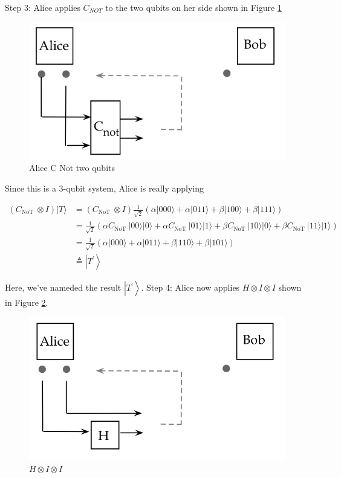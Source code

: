 \documentclass[main.tex]{subfiles}
\begin{document}
    Step 3: Alice applies $C_{NOT}$ to the two qubits on her side shown in Figure \ref{fig:30teleport3}
    
    \begin{figure}
        \centering
        \includegraphics[width=5in]{notes/figs/n07/30teleport3.png}
        \caption{Alice C Not two qubits}
        \label{fig:30teleport3}
    \end{figure}
    
    Since this is a 3-qubit system, Alice is really applying
    
    $$
    \begin{aligned}
    \left(C_{\text {NoT }} \otimes I\right)|T\rangle &=\left(C_{\text {NoT }} \otimes I\right) \frac{1}{\sqrt{2}}(\alpha|000\rangle+\alpha|011\rangle+\beta|100\rangle+\beta|111\rangle) \\
    &=\frac{1}{\sqrt{2}}\left(\alpha C_{\text {NoT }}|00\rangle|0\rangle+\alpha C_{\text {NoT }}|01\rangle|1\rangle+\beta C_{\text {NoT }}|10\rangle|0\rangle+\beta C_{\text {NoT }}|11\rangle|1\rangle\right) \\
    &=\frac{1}{\sqrt{2}}(\alpha|000\rangle+\alpha|011\rangle+\beta|110\rangle+\beta|101\rangle) \\
    & \triangleq\left|T^{\prime}\right\rangle
    \end{aligned}
    $$
    
    Here, we've nameded the result $\left|T^{\prime}\right\rangle$. Step 4: Alice now applies $H \otimes I \otimes I$ shown in Figure \ref{fig:31teleport4}.
    
    \begin{figure}
        \centering
        \includegraphics[width=5in]{notes/figs/n07/31teleport4.png}
        \caption{$H \otimes I \otimes I$}
        \label{fig:31teleport4}
    \end{figure}
    
\end{document}
